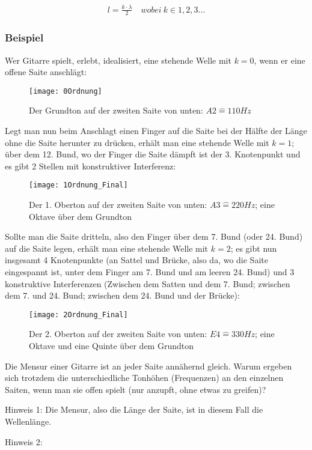 	\begin{align} \label{eq:stehendewelle}
		l = \frac{k \cdot \lambda}{2} \quad wobei \ k \in 1,2,3...
	\end{align}
	
	
\subsubsection{Beispiel}

Wer Gitarre spielt, erlebt, idealisiert, eine stehende Welle mit $k=0$, wenn er eine offene Saite anschlägt:

\begin{figure}
		\centering
		\texttt{[image: 0Ordnung]}
		\caption{Der Grundton auf der zweiten Saite von unten: $A2 \widehat{=} 110Hz$}
		\label{fig:grundton}
\end{figure}

Legt man nun beim Anschlagt einen Finger auf die Saite bei der Hälfte der Länge ohne die Saite herunter zu drücken, erhält man eine stehende Welle mit $k=1$; über dem 12. Bund, wo der Finger die Saite dämpft ist der 3. Knotenpunkt und es gibt 2 Stellen mit konstruktiver Interferenz:

\begin{figure}
		\centering
		\texttt{[image: 1Ordnung\_Final]}
		\caption{Der 1. Oberton auf der zweiten Saite von unten: $A3 \widehat{=} 220Hz$; eine Oktave über dem Grundton}
		\label{fig:ersteroberton}
\end{figure}

Sollte man die Saite \glqq dritteln\grqq , also den Finger über dem 7. Bund (oder 24. Bund) auf die Saite legen, erhält man eine stehende Welle mit $k=2$; es gibt nun insgesamt 4 Knotenpunkte (an Sattel und Brücke, also da, wo die Saite eingespannt ist, unter dem Finger am 7. Bund und am leeren 24. Bund) und 3 konstruktive Interferenzen (Zwischen dem Satten und dem 7. Bund; zwischen dem 7. und 24. Bund; zwischen dem 24. Bund und der Brücke):

\begin{figure}
		\centering
		\texttt{[image: 2Ordnung\_Final]}
		\caption{Der 2. Oberton auf der zweiten Saite von unten: $E4 \widehat{=} 330Hz$; eine Oktave und eine Quinte über dem Grundton}
		\label{fig:zweiteroberton}
\end{figure}

\begin{Aufgabe}
Die Mensur einer Gitarre ist an jeder Saite annähernd gleich. Warum ergeben sich trotzdem die unterschiedliche Tonhöhen (Frequenzen) an den einzelnen Saiten, wenn man sie offen spielt (nur anzupft, ohne etwas zu greifen)?

\noindent Hinweis 1: Die Mensur, also die Länge der Saite, ist in diesem Fall die Wellenlänge.

\noindent Hinweis 2: 
\end{Aufgabe}
